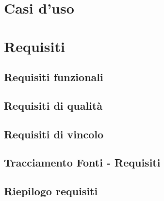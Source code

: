 %
%
%


\newpage
\section{Casi d'uso}

\newpage
\section{Requisiti}
\subsection{Requisiti funzionali}

\newpage
\subsection{Requisiti di qualità}

\newpage
\subsection{Requisiti di vincolo}

\newpage
\subsection{Tracciamento Fonti - Requisiti}

\newpage
\subsection{Riepilogo requisiti}

\newpage
